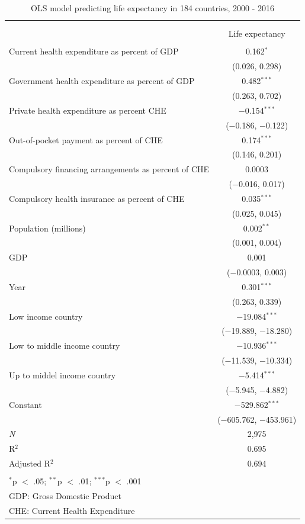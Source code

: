 \documentclass[]{elsarticle} %
\begin{document}
\begin{table}[H] \centering 
  \caption{OLS model predicting life expectancy in 184 countries, 2000 - 2016} 
  \label{poolOLS} 
\begin{tabular}{@{\extracolsep{5pt}}lc} 
\\[-1.8ex]\hline \\[-1.8ex] 
\\[-1.8ex] & Life expectancy \\ 
\hline \\[-1.8ex] 
 Current health expenditure as percent of GDP & 0.162$^{*}$ \\ 
  & (0.026, 0.298) \\ 
  Government health expenditure as percent of GDP & 0.482$^{***}$ \\ 
  & (0.263, 0.702) \\ 
  Private health expenditure as percent CHE & $-$0.154$^{***}$ \\ 
  & ($-$0.186, $-$0.122) \\ 
  Out-of-pocket payment as percent of CHE & 0.174$^{***}$ \\ 
  & (0.146, 0.201) \\ 
  Compulsory financing arrangements as percent of CHE & 0.0003 \\ 
  & ($-$0.016, 0.017) \\ 
  Compulsory health insurance as percent of CHE & 0.035$^{***}$ \\ 
  & (0.025, 0.045) \\ 
  Population (millions) & 0.002$^{**}$ \\ 
  & (0.001, 0.004) \\ 
  GDP & 0.001 \\ 
  & ($-$0.0003, 0.003) \\ 
  Year & 0.301$^{***}$ \\ 
  & (0.263, 0.339) \\ 
  Low income country & $-$19.084$^{***}$ \\ 
  & ($-$19.889, $-$18.280) \\ 
  Low to middle income country & $-$10.936$^{***}$ \\ 
  & ($-$11.539, $-$10.334) \\ 
  Up to middel income country & $-$5.414$^{***}$ \\ 
  & ($-$5.945, $-$4.882) \\ 
  Constant & $-$529.862$^{***}$ \\ 
  & ($-$605.762, $-$453.961) \\ 
 \textit{N} & 2,975 \\ 
R$^{2}$ & 0.695 \\ 
Adjusted R$^{2}$ & 0.694 \\ 
\hline \\[-1.8ex] 
\multicolumn{2}{l}{$^{*}$p $<$ .05; $^{**}$p $<$ .01; $^{***}$p $<$ .001} \\ 
\multicolumn{2}{l}{GDP: Gross Domestic Product} \\ 
\multicolumn{2}{l}{CHE: Current Health Expenditure} \\ 
\end{tabular} 
\end{table}
\end{document}
